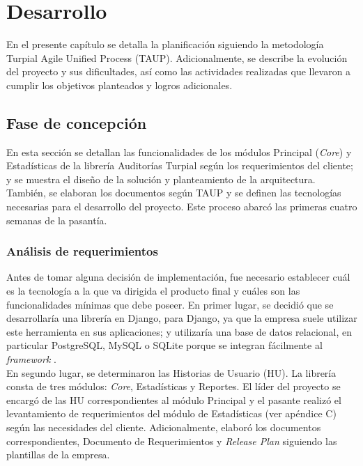 \chapter{\textbf{Desarrollo}}

\thispagestyle{empty}

En el presente capítulo se detalla la planificación siguiendo la metodología Turpial Agile Unified Process (TAUP). Adicionalmente, se describe la evolución del proyecto y sus dificultades, así como las actividades realizadas que llevaron a cumplir los objetivos planteados y logros adicionales.

\section{Fase de concepción}

En esta sección se detallan las funcionalidades de los módulos Principal (\textit{Core}) y Estadísticas de la librería Auditorías Turpial según los requerimientos del cliente; y se muestra el diseño de la solución y  planteamiento de la arquitectura. También, se elaboran los documentos según TAUP y se definen las tecnologías necesarias para el desarrollo del proyecto. Este proceso abarcó las primeras cuatro semanas de la pasantía.

\subsection{Análisis de requerimientos}

Antes de tomar alguna decisión de implementación, fue necesario establecer cuál es la tecnología a la que va dirigida el producto final y cuáles son las funcionalidades mínimas que debe poseer. En primer lugar, se decidió que se desarrollaría una librería en Django, para Django, ya que la empresa suele utilizar este herramienta en sus aplicaciones; y utilizaría una base de datos relacional, en particular PostgreSQL, MySQL o SQLite porque se integran fácilmente al \textit{framework} . \\

En segundo lugar, se determinaron las Historias de Usuario (HU). La librería consta de tres módulos: \textit{Core}, Estadísticas y Reportes. El líder del proyecto se encargó de las HU correspondientes al módulo Principal y el pasante realizó el levantamiento de requerimientos del módulo de Estadísticas (ver apéndice C) según las necesidades del cliente. Adicionalmente, elaboró los documentos correspondientes, Documento de Requerimientos y \textit{Release Plan} siguiendo las plantillas de la empresa. \\

